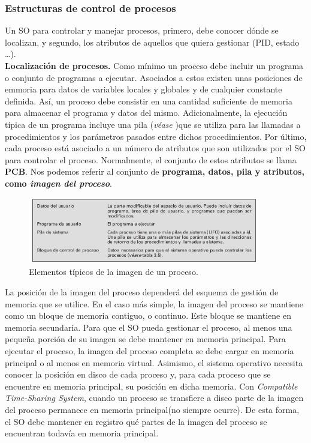\documentclass{article}
\begin{document}
			\subsubsection{Estructuras de control de procesos}
				Un SO para controlar y manejar procesos, primero, debe conocer dónde se localizan, y segundo, los atributos de aquellos que quiera gestionar (PID, estado \ldots). \\
				
				\textbf{Localización de procesos.} Como mínimo un proceso debe incluir un programa o conjunto de programas a ejecutar. Asociados a estos existen unas posiciones de emmoria para datos de variables locales y globales y de cualquier constante definida. Así, un proceso debe consistir en una cantidad suficiente de memoria para almacenar el programa y datos del mismo. Adicionalmente, la ejecución típica de un programa incluye una pila (\textit{véase} \pageref{Control de procedimientos})que se utiliza para las llamadas a procedimientos y los parámetros pasados entre dichos procedimientos. Por último, cada proceso está asociado a un número de atributos que son utilizados por el SO para controlar el proceso. Normalmente, el conjunto de estos atributos se llama \textbf{PCB}. Nos podemos referir al conjunto de \textbf{programa, datos, pila y atributos, como \textit{imagen del proceso}}. \\				
				
				\begin{figure}
				\caption{Elementos típicos de la imagen de un proceso.}
				\label{2.9:imagenproceso}
				\centering
				\includegraphics[width=0.9\textwidth, scale=1]{tema_2_figura9.png}
				\end{figure}
				
				La posición de la imagen del proceso dependerá del esquema de gestión de memoria que se utilice. En el caso más simple, la imagen del proceso se mantiene como un bloque de memoria contiguo, o continuo. Este bloque se mantiene en memoria secundaria. Para que el SO pueda gestionar el proceso, al menos una pequeña porción de su imagen se debe mantener en memoria principal. Para ejecutar el proceso, la imagen del proceso completa se debe cargar en memoria principal o al menos en memoria virtual. Asimismo, el sistema operativo necesita conocer la posición en disco de cada proceso y, para cada proceso que se encuentre en memoria principal, su posición en dicha memoria. Con \textit{Compatible Time-Sharing System}, cuando un proceso se transfiere a disco parte de la imagen del proceso permanece en memoria principal(no siempre ocurre). De esta forma, el SO debe mantener en registro qué partes de la imagen del proceso se encuentran todavía en memoria principal. \\
				
\end{document}
